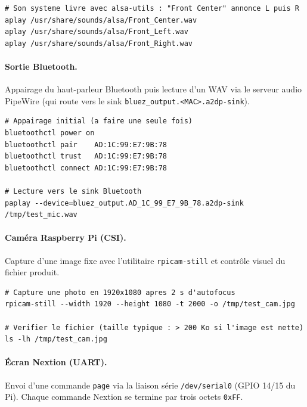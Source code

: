 \documentclass[a4paper,12pt]{report}
\begin{document}
\begin{lstlisting}[style=kodatest, language=shellkoda, caption={Lecture d'un son test stereo}]
# Son systeme livre avec alsa-utils : "Front Center" annonce L puis R
aplay /usr/share/sounds/alsa/Front_Center.wav
aplay /usr/share/sounds/alsa/Front_Left.wav
aplay /usr/share/sounds/alsa/Front_Right.wav
\end{lstlisting}

	\paragraph{Sortie Bluetooth.}
	Appairage du haut-parleur Bluetooth puis lecture d'un WAV via le serveur audio
	PipeWire (qui route vers le sink \texttt{bluez\_output.<MAC>.a2dp-sink}).

\begin{lstlisting}[style=kodatest, language=shellkoda, caption={Appairage et lecture sur HP Bluetooth}]
# Appairage initial (a faire une seule fois)
bluetoothctl power on
bluetoothctl pair    AD:1C:99:E7:9B:78
bluetoothctl trust   AD:1C:99:E7:9B:78
bluetoothctl connect AD:1C:99:E7:9B:78

# Lecture vers le sink Bluetooth
paplay --device=bluez_output.AD_1C_99_E7_9B_78.a2dp-sink /tmp/test_mic.wav
\end{lstlisting}

	\paragraph{Caméra Raspberry Pi (CSI).}
	Capture d'une image fixe avec l'utilitaire \texttt{rpicam-still} et contrôle
	visuel du fichier produit.

\begin{lstlisting}[style=kodatest, language=shellkoda, caption={Capture d'une image avec rpicam-still}]
# Capture une photo en 1920x1080 apres 2 s d'autofocus
rpicam-still --width 1920 --height 1080 -t 2000 -o /tmp/test_cam.jpg

# Verifier le fichier (taille typique : > 200 Ko si l'image est nette)
ls -lh /tmp/test_cam.jpg
\end{lstlisting}

	\paragraph{Écran Nextion (UART).}
	Envoi d'une commande \texttt{page} via la liaison série \texttt{/dev/serial0}
	(GPIO 14/15 du Pi). Chaque commande Nextion se termine par trois octets
	\texttt{0xFF}.
\end{document}
